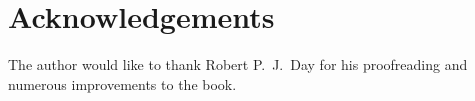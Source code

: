 \chapter*{Acknowledgements}%
%
%
The author would like to thank Robert P.~J.\ Day for his proofreading and numerous improvements to the book.
